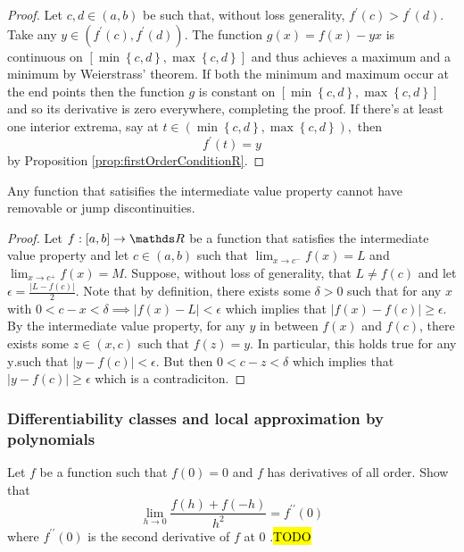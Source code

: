 \begin{proof}
	Let $c,d\in\left(a,b\right)$ be such that, without loss generality,
	$f^{\prime}\left(c\right)>f^{\prime}\left(d\right).$ Take any $y\in\left(f^{\prime}\left(c\right),f^{\prime}\left(d\right)\right)$.
	The function $g\left(x\right)=f\left(x\right)-yx$ is continuous on
	$\left[\min\left\{ c,d\right\} ,\max\left\{ c,d\right\} \right]$
	and thus achieves a maximum and a minimum by Weierstrass' theorem.
	If both the minimum and maximum occur at the end points then the function
	$g$ is constant on $\left[\min\left\{ c,d\right\} ,\max\left\{ c,d\right\} \right]$
	and so its derivative is zero everywhere, completing the proof. If
	there's at least one interior extrema, say at $t\in\left(\min\left\{ c,d\right\} ,\max\left\{ c,d\right\} \right),$
	then
	\[
	f^{\prime}\left(t\right)=y
	\]
	by Proposition \ref{prop:firstOrderConditionR}.
\end{proof}
\begin{lem}
	\label{lem:IVTJump}Any function that satisifies the intermediate
	value property cannot have removable or jump discontinuities.
\end{lem}

\begin{proof}
	Let $f:\left[a,b\right]\to\R$ be a function that satisfies the intermediate
	value property and let $c\in\left(a,b\right)$ such that $\lim_{x\to c^{-}}f\left(x\right)=L$
	and $\lim_{x\to c^{+}}f\left(x\right)=M$. Suppose, without loss of
	generality, that $L\neq f\left(c\right)$ and let $\epsilon=\frac{\lvert L-f\left(c\right)\rvert}{2}.$
	Note that by definition, there exists some $\delta>0$ such that for
	any $x$ with $0<c-x<\delta\implies\lvert f\left(x\right)-L\rvert<\epsilon$
	which implies that $\lvert f\left(x\right)-f\left(c\right)\rvert\geq\epsilon.$
	By the intermediate value property, for any $y$ in between $f\left(x\right)$
	and $f\left(c\right)$, there exists some $z\in\left(x,c\right)$
	such that $f\left(z\right)=y.$ In particular, this holds true for
	any $\text{y}.$such that $\lvert y-f\left(c\right)\rvert<\epsilon.$
	But then $0<c-z<\delta$ which implies that $\lvert y-f\left(c\right)\rvert\geq\epsilon$
	which is a contradiciton.
\end{proof}

\subsubsection{Differentiability classes and local approximation by polynomials}
\begin{example}
	\label{exa:isi2007samplepsb3}Let $f$ be a function such that $f(0)=0$
	and $f$ has derivatives of all order. Show that 
	\[
	\lim_{h\rightarrow0}\frac{f(h)+f(-h)}{h^{2}}=f^{\prime\prime}(0)
	\]
	where $f^{\prime\prime}(0)$ is the second derivative of $f$ at
	0 .\hl{TODO}
\end{example}


